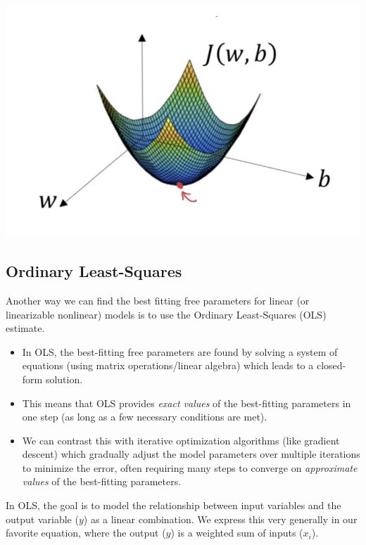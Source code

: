 \documentclass[
  letterpaper,
  DIV=11,
  numbers=noendperiod]{scrartcl}
\providecommand{\tightlist}{%
  \setlength{\itemsep}{0pt}\setlength{\parskip}{0pt}}\usepackage{longtable,booktabs,array}
\begin{document}
\includegraphics{../assests/images/grad-desct-linearmodel.png}

\subsection{Ordinary Least-Squares}\label{ordinary-least-squares}

Another way we can find the best fitting free parameters for linear (or
linearizable nonlinear) models is to use the Ordinary Least-Squares
(OLS) estimate.

\begin{itemize}
\tightlist
\item
  In OLS, the best-fitting free parameters are found by solving a system
  of equations (using matrix operations/linear algebra) which leads to a
  closed-form solution.\\
\item
  This means that OLS provides \emph{exact values} of the best-fitting
  parameters in one step (as long as a few necessary conditions are
  met).
\item
  We can contrast this with iterative optimization algorithms (like
  gradient descent) which gradually adjust the model parameters over
  multiple iterations to minimize the error, often requiring many steps
  to converge on \emph{approximate values} of the best-fitting
  parameters.
\end{itemize}

In OLS, the goal is to model the relationship between input variables
and the output variable (\(y\)) as a linear combination. We express this
very generally in our favorite equation, where the output (\(y\)) is a
weighted sum of inputs (\(x_i\)).
\end{document}
